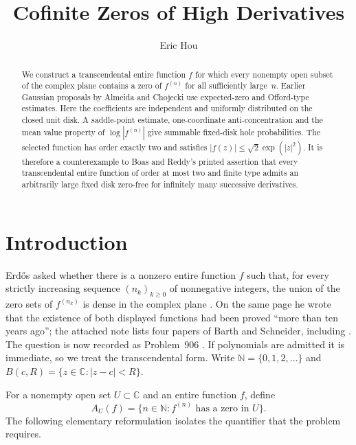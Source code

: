 \documentclass[plain]{baustms}
\title{Cofinite Zeros of High Derivatives}
\author{Eric Hou}
\newcommand{\C}{\mathbb C}
\newcommand{\N}{\mathbb N}
\theoremstyle{cupthm}
\begin{document}
\begin{abstract}
We construct a transcendental entire function $f$ for which every nonempty
open subset of the complex plane contains a zero of $f^{(n)}$ for all
sufficiently large~$n$. Earlier Gaussian proposals by Almeida and Chojecki use
expected-zero and Offord-type estimates. Here the coefficients are independent
and uniformly distributed on the closed unit disk. A saddle-point estimate,
one-coordinate anti-concentration and the mean value property of
$\log|f^{(n)}|$ give summable fixed-disk hole probabilities. The selected
function has order exactly two and satisfies
$|f(z)|\leq\sqrt2\exp(|z|^2)$. It is therefore a
counterexample to Boas and Reddy's printed assertion that every transcendental
entire function of order at most two and finite type admits an arbitrarily
large fixed disk zero-free for infinitely many successive derivatives.
\end{abstract}


\maketitle

\section{Introduction}

Erd\H{o}s asked whether there is a nonzero entire function $f$ such that, for
every strictly increasing sequence $(n_k)_{k\geq0}$ of nonnegative integers,
the union of the zero sets of $f^{(n_k)}$ is dense in the complex plane
\cite[p.~72]{Erdos1982}. On the same page he wrote that the existence of both
displayed functions had been proved ``more than ten years ago''; the attached
note lists four papers of Barth and Schneider, including
\cite{BarthSchneider1972}. The question is now recorded as Problem~906
\cite{Bloom906}. If polynomials are admitted it is immediate, so we treat the
transcendental form. Write $\N=\{0,1,2,\ldots\}$ and
$B(c,R)=\{z\in\C:|z-c|<R\}$.

For a nonempty open set $U\subset\C$ and an entire function $f$, define
\[
 A_U(f)=\{n\in\N:f^{(n)}\text{ has a zero in }U\}.
\]
The following elementary reformulation isolates the quantifier that the
problem requires.
\end{document}
